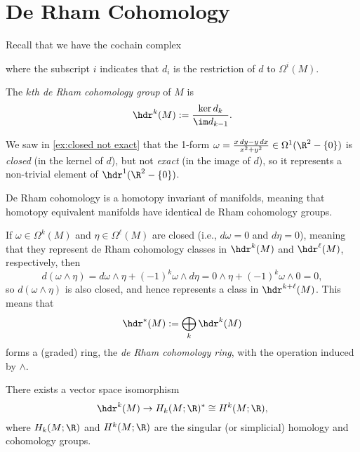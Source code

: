 
\section{De Rham Cohomology}
\label{sec:de Rham}

Recall that we have the cochain complex
	\begin{center}
	\end{center}
where the subscript $i$ indicates that $d_i$ is the restriction of $d$ to $\Omega^i(M)$.

\begin{definition}\label{def:de Rham cohomology}
	The \emph{$k$th de Rham cohomology group} of $M$ is
	\[
		\hdr^k(M) := \frac{\ker d_k}{\im d_{k-1}}.
	\]
\end{definition}

\begin{example}\label{ex:closed not exact 2}
	We saw in \cref{ex:closed not exact} that the 1-form $\omega = \frac{x\, dy - y\, dx}{x^2 + y^2} \in \Omega^1(\R^2 -\{0\})$ is \emph{closed} (in the kernel of $d$), but not \emph{exact} (in the image of $d$), so it represents a non-trivial element of $\hdr^1(\R^2 - \{0\})$.
\end{example}

De Rham cohomology is a homotopy invariant of manifolds, meaning that homotopy equivalent manifolds have identical de Rham cohomology groups. 

If $\omega \in \Omega^k(M)$ and $\eta \in \Omega^\ell(M)$ are closed (i.e., $d \omega = 0$ and $d\eta = 0$), meaning that they represent de Rham cohomology classes in $\hdr^k(M)$ and  $\hdr^\ell(M)$, respectively, then
\[
	d(\omega \wedge \eta) = d\omega \wedge \eta + (-1)^k \omega \wedge d\eta = 0 \wedge \eta + (-1)^k \omega \wedge 0 = 0,
\]
so $d(\omega \wedge \eta)$ is also closed, and hence represents a class in $\hdr^{k+\ell}(M)$. This means that
\[
	\hdr^\ast(M) := \bigoplus_k \hdr^k(M)
\]
forms a (graded) ring, the \emph{de Rham cohomology ring}, with the operation induced by $\wedge$.

\begin{theorem}\label{thm:de Rham}
	There exists a vector space isomorphism
	\[
		\hdr^k(M) \to H_k(M;\R)^\ast \cong H^k(M;\R),
	\]
	where $H_k(M;\R)$ and $H^k(M;\R)$ are the singular (or simplicial) homology and cohomology groups.
\end{theorem}

